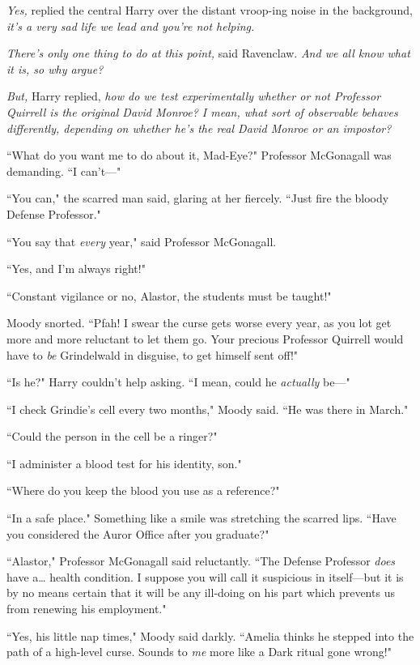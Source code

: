 \emph{Yes,} replied the central Harry over the distant vroop-ing noise in the background, \emph{it's a very sad life we lead and \emph{you're not helping}.}

\emph{There's only one thing to do at this point,} said Ravenclaw. \emph{And we all know what it is, so why argue?}

\emph{But,} Harry replied, \emph{how \emph{do} we test experimentally whether or not Professor Quirrell is the original David Monroe? I mean, what sort of observable behaves differently, depending on whether he's the real David Monroe or an impostor?}

``What do you want me to do about it, Mad-Eye?" Professor McGonagall was demanding. ``I can't—"

``You can," the scarred man said, glaring at her fiercely. ``Just fire the bloody Defense Professor."

``You say that \emph{every} year," said Professor McGonagall.

``Yes, and I'm always right!"

``Constant vigilance or no, Alastor, the students must be taught!"

Moody snorted. ``Pfah! I swear the curse gets worse every year, as you lot get more and more reluctant to let them go. Your precious Professor Quirrell would have to \emph{be} Grindelwald in disguise, to get himself sent off!"

``Is he?" Harry couldn't help asking. ``I mean, could he \emph{actually} be—"

``I check Grindie's cell every two months," Moody said. ``He was there in March."

``Could the person in the cell be a ringer?"

``I administer a blood test for his identity, son."

``Where do you keep the blood you use as a reference?"

``In a safe place." Something like a smile was stretching the scarred lips. ``Have you considered the Auror Office after you graduate?"

``Alastor," Professor McGonagall said reluctantly. ``The Defense Professor \emph{does} have a{\ldots} health condition. I suppose you will call it suspicious in itself—but it is by no means certain that it will be any ill-doing on his part which prevents us from renewing his employment."

``Yes, his little nap times," Moody said darkly. ``Amelia thinks he stepped into the path of a high-level curse. Sounds to \emph{me} more like a Dark ritual gone wrong!"

